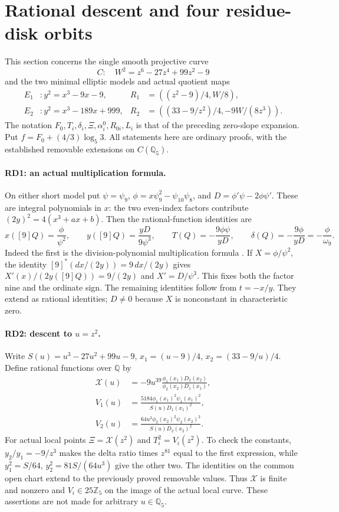 \section{Rational descent and four residue-disk orbits}
\label{sec-fixed-rational-descent}

This section concerns the single smooth projective curve
\[
 C:\quad W^2=z^6-27z^4+99z^2-9
\]
and the two minimal elliptic models and actual quotient maps
\[
\begin{aligned}
 E_1 &: y^2=x^3-9x-9, &R_1&=((z^2-9)/4,W/8),\\
 E_2 &: y^2=x^3-189x+999, &R_2&=((33-9/z^2)/4,-9W/(8z^3)).
\end{aligned}
\]
The notation $F_0,T_i,\delta_i,\Xi,\alpha_i^0,R_{0i},L_i$ is that
of the preceding zero-slope expansion. Put
$f=F_0+(4/3)\log_5 3$. All statements here are ordinary proofs,
with the established removable extensions on $C(\mathbb Q_5)$.

\paragraph{RD1: an actual multiplication formula.}
On either short model put $\psi=\psi_9$, $\phi=x\psi_9^2-\psi_{10}\psi_8$,
and $D=\phi'\psi-2\phi\psi'$. These are integral polynomials in $x$:
the two even-index factors contribute $(2y)^2=4(x^3+ax+b)$.
Then the rational-function identities are
\[
 x([9]Q)=\frac\phi{\psi^2},\qquad
 y([9]Q)=\frac{yD}{9\psi^3},\qquad
 T(Q)=-\frac{9\phi\psi}{yD},\qquad
 \delta(Q)=-\frac{9\phi}{yD}=-\frac\phi{\omega_9}.
\]
Indeed the first is the division-polynomial multiplication formula
\cite{SutherlandDivisionPolynomials2023}. If $X=\phi/\psi^2$, the identity
$[9]^*(dx/(2y))=9\,dx/(2y)$ gives
$X'(x)/(2y([9]Q))=9/(2y)$ and $X'=D/\psi^3$.
This fixes both the factor nine and the ordinate sign. The remaining
identities follow from $t=-x/y$. They extend as rational identities;
$D\ne0$ because $X$ is nonconstant in characteristic zero.

\paragraph{RD2: descent to $u=z^2$.}
Write $S(u)=u^3-27u^2+99u-9$, $x_1=(u-9)/4$, $x_2=(33-9/u)/4$.
Define rational functions over $\mathbb Q$ by
\[
\begin{split}
 \mathcal X(u)&=-9u^{39}\frac{\phi_1(x_1)D_2(x_2)}{\phi_2(x_2)D_1(x_1)},\\
 V_1(u)&=\frac{5184\phi_1(x_1)^2\psi_1(x_1)^2}{S(u)D_1(x_1)^2},\\
 V_2(u)&=\frac{64u^3\phi_2(x_2)^2\psi_2(x_2)^2}{S(u)D_2(x_2)^2}.
\end{split}
\]
For actual local points $\Xi=\mathcal X(z^2)$ and $T_i^2=V_i(z^2)$.
To check the constants, $y_2/y_1=-9/z^3$ makes the delta ratio times
$z^{81}$ equal to the first expression, while
$y_1^2=S/64$, $y_2^2=81S/(64u^3)$ give the other two.
The identities on the common open chart extend to the previously
proved removable values. Thus $\mathcal X$ is finite and nonzero and
$V_i\in25\mathbb Z_5$ on the image of the actual local curve.
These assertions are not made for arbitrary $u\in\mathbb Q_5$.

